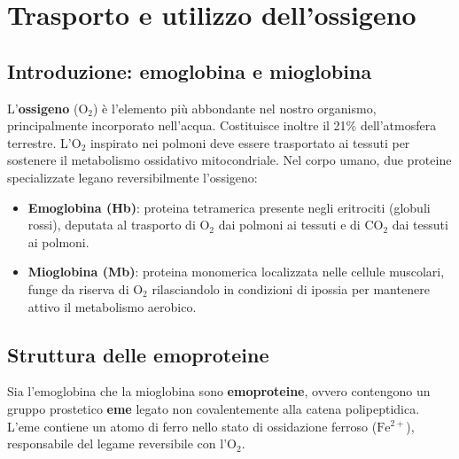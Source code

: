 \documentclass[12pt,a4paper]{report}
\begin{document}
\chapter{Trasporto e utilizzo dell'ossigeno}
\section{Introduzione: emoglobina e mioglobina}
L'\textbf{ossigeno} (\(\mathrm{O_2}\)) è l'elemento più abbondante nel nostro organismo, principalmente incorporato nell'acqua. Costituisce inoltre il 21\% dell'atmosfera terrestre. L'\(\mathrm{O_2}\) inspirato nei polmoni deve essere trasportato ai tessuti per sostenere il metabolismo ossidativo mitocondriale.
Nel corpo umano, due proteine specializzate legano reversibilmente l'ossigeno:
\begin{itemize}
\item \textbf{Emoglobina (Hb)}: proteina tetramerica presente negli eritrociti (globuli rossi), deputata al trasporto di \(\mathrm{O_2}\) dai polmoni ai tessuti e di \(\mathrm{CO_2}\) dai tessuti ai polmoni.
\item \textbf{Mioglobina (Mb)}: proteina monomerica localizzata nelle cellule muscolari, funge da riserva di \(\mathrm{O_2}\) rilasciandolo in condizioni di ipossia per mantenere attivo il metabolismo aerobico.
\end{itemize}

\section{Struttura delle emoproteine}
Sia l'emoglobina che la mioglobina sono \textbf{emoproteine}, ovvero contengono un gruppo prostetico \textbf{eme} legato non covalentemente alla catena polipeptidica. L'eme contiene un atomo di ferro nello stato di ossidazione ferroso (\(\mathrm{Fe^{2+}}\)), responsabile del legame reversibile con l'\(\mathrm{O_2}\).
\end{document}
